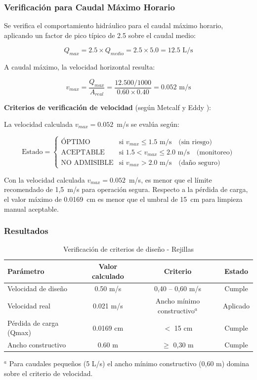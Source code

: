 \documentclass[12pt,a4paper]{article}
\begin{document}
\subsubsection{Verificación para Caudal Máximo Horario}

Se verifica el comportamiento hidráulico para el caudal máximo horario, aplicando un factor de pico típico de 2.5 sobre el caudal medio:

\begin{equation}
Q_{max} = 2.5 \times Q_{medio} = 2.5 \times 5.0 = 12.5 \text{ L/s}
\end{equation}

A caudal máximo, la velocidad horizontal resulta:

\begin{equation}
v_{max} = \frac{Q_{max}}{A_{real}} = \frac{12.500/1000}{0.60 \times 0.40} = 0.052 \text{ m/s}
\end{equation}

\textbf{Criterios de verificación de velocidad} (según Metcalf y Eddy \cite{metcalf2014}):

La velocidad calculada $v_{max} = 0.052$~m/s se evalúa según:

\begin{equation}
\text{Estado} = \begin{cases}
    \text{ÓPTIMO} & \text{si } v_{max} \leq 1.5 \text{ m/s} \quad \text{(sin riesgo)} \\
    \text{ACEPTABLE} & \text{si } 1.5 < v_{max} \leq 2.0 \text{ m/s} \quad \text{(monitoreo)} \\
    \text{NO ADMISIBLE} & \text{si } v_{max} > 2.0 \text{ m/s} \quad \text{(daño seguro)}
\end{cases}
\end{equation}

Con la velocidad calculada $v_{max} = 0.052$~m/s, es menor que el límite recomendado de 1,5~m/s para operación segura. Respecto a la pérdida de carga, el valor máximo de 0.0169~cm es menor que el umbral de 15~cm para limpieza manual aceptable.

\subsubsection{Resultados}

\begin{table}[H]
\centering
\caption{Verificación de criterios de diseño - Rejillas}
\begin{tabular}{lccc}
\toprule
Parámetro & Valor calculado & Criterio & Estado \\
\midrule
Velocidad de diseño & 0.50 m/s & 0,40 -- 0,60 m/s & Cumple \\
Velocidad real & 0.021 m/s & Ancho mínimo constructivo$^a$ & Aplicado \\
Pérdida de carga (Qmax) & 0.0169 cm & $<$ 15 cm & Cumple \\
Ancho constructivo & 0.60 m & $\geq$ 0,30 m & Cumple \\
\bottomrule
\end{tabular}
\small
$^a$ Para caudales pequeños (5 L/s) el ancho mínimo constructivo (0,60 m) domina sobre el criterio de velocidad.
\end{table}
\end{document}
